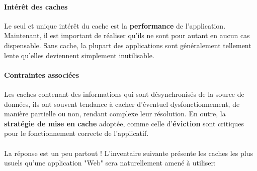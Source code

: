 {  \paragraph{Intérêt des caches} Le seul et unique intérêt du cache est la \textbf{performance} de
  l'application. Maintenant, il est important de réaliser qu'ils ne sont pour autant en aucun cas
  dispensable. Sans cache, la plupart des applications sont généralement tellement lente qu'elles
  deviennent simplement inutilisable.

  \paragraph{Contraintes associées} Les caches contenant des informations qui sont désynchronisés
  de la source de données, ils ont souvent tendance à cacher d'éventuel dysfonctionnement, de
  manière partielle ou non, rendant complexe leur résolution. En outre, la \textbf{stratégie de mise
  en cache} adoptée, comme celle d'\textbf{éviction} sont critiques pour le fonctionnement correcte
  de l'applicatif.


  \paragraph{} La réponse est un peu partout ! L'inventaire suivante présente les caches les plus
  usuels qu'une application "Web" sera naturellement amené à utiliser:

  \allcaches
}


